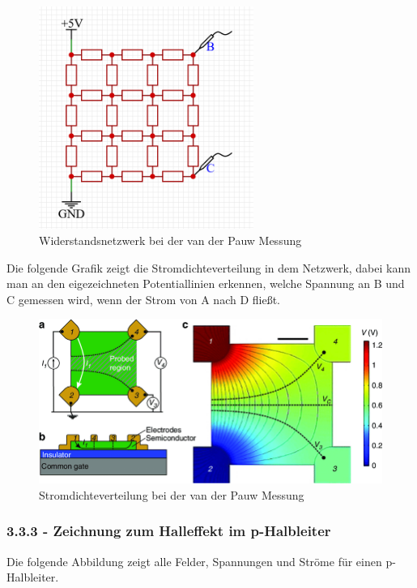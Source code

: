 \documentclass[a4paper]{scrartcl}
\numberwithin{equation}{subsection}
\begin{document}
\begin{figure}[H]
\includegraphics[width=7cm]{Widerstandsnetzwerk_v3}
\centering
\caption{Widerstandsnetzwerk bei der van der Pauw Messung}
\centering
\label{fig:widerstandsnetzwerk}
\end{figure}

Die folgende Grafik zeigt die Stromdichteverteilung in dem Netzwerk, dabei kann man an den eigezeichneten Potentiallinien erkennen, welche Spannung an B und C gemessen wird, wenn der Strom von A nach D fließt.

\begin{figure}[H]
\includegraphics[width=12cm]{Top-view-of-van-der-Pauw-square-shaped}
\centering
\caption{Stromdichteverteilung bei der van der Pauw Messung \protect\footnotemark}
\centering
\label{fig:top-view-of-van-der-pauw}
\end{figure}


\subsubsection{3.3.3 - Zeichnung zum Halleffekt im p-Halbleiter}
Die folgende Abbildung zeigt alle Felder, Spannungen und Ströme für einen p-Halbleiter.
\end{document}
